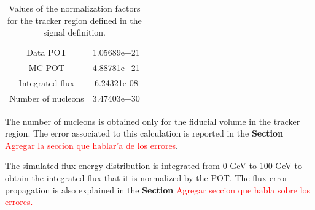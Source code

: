 \begin{table}[!h]
    \centering
    \begin{tabular}{c|c}
        Data POT & 1.05689e+21 \\
        MC POT & 4.88781e+21 \\
        Integrated flux & 6.24321e-08 \\
        Number of nucleons & 3.47403e+30
    \end{tabular}
    \caption{Values of the normalization factors for the tracker region defined in the signal definition.}
    \label{tab:my_label}
\end{table}

The number of nucleons is obtained only for the fiducial volume in the tracker region. The error associated to this calculation is reported in the \textbf{Section} \textcolor{red}{Agregar la seccion que hablar'a de los errores}.

The simulated flux energy distribution is integrated from 0 GeV to 100 GeV to obtain the integrated flux that it is normalized by the POT. The flux error propagation is also explained in the \textbf{Section} \textcolor{red}{Agregar seccion que habla sobre los errores.}







